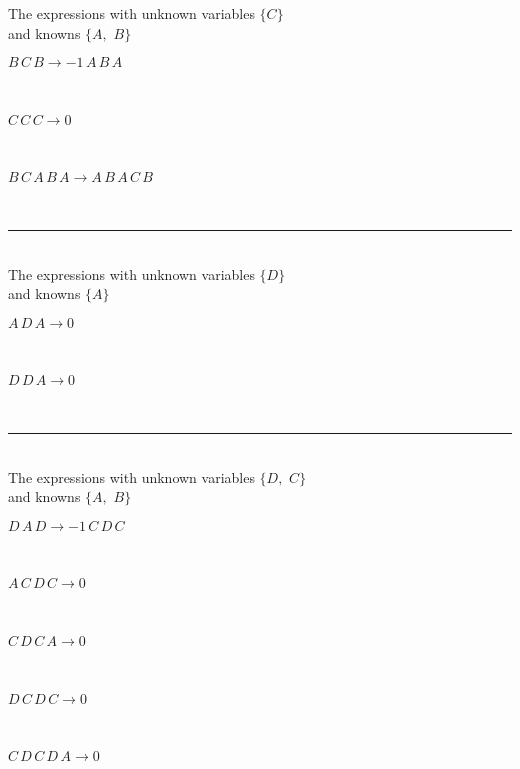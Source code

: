 The expressions with unknown variables $\{C\}$\\
and knowns $\{A,
$ $
B\}$\smallskip\\
\begin{minipage}{6in}
$
B\,
 C\,
 B\rightarrow -1\,
 A\,
 B\,
 A
$
\end{minipage}\medskip \\
\begin{minipage}{6in}
$
C\,
 C\,
 C\rightarrow 0
$
\end{minipage}\medskip \\
\begin{minipage}{6in}
$
B\,
 C\,
 A\,
 B\,
 A\rightarrow A\,
 B\,
 A\,
 C\,
 B
$
\end{minipage}\\
\rule[3pt]{6in}{.7pt}\\
The expressions with unknown variables $\{D\}$\\
and knowns $\{A\}$\smallskip\\
\begin{minipage}{6in}
$
A\,
 D\,
 A\rightarrow 0
$
\end{minipage}\medskip \\
\begin{minipage}{6in}
$
D\,
 D\,
 A\rightarrow 0
$
\end{minipage}\\
\rule[3pt]{6in}{.7pt}\\
The expressions with unknown variables $\{D,
$ $
C\}$\\
and knowns $\{A,
$ $
B\}$\smallskip\\
\begin{minipage}{6in}
$
D\,
 A\,
 D\rightarrow -1\,
 C\,
 D\,
 C
$
\end{minipage}\medskip \\
\begin{minipage}{6in}
$
A\,
 C\,
 D\,
 C\rightarrow 0
$
\end{minipage}\medskip \\
\begin{minipage}{6in}
$
C\,
 D\,
 C\,
 A\rightarrow 0
$
\end{minipage}\medskip \\
\begin{minipage}{6in}
$
D\,
 C\,
 D\,
 C\rightarrow 0
$
\end{minipage}\medskip \\
\begin{minipage}{6in}
$
C\,
 D\,
 C\,
 D\,
 A\rightarrow 0
$
\end{minipage}\medskip \\
